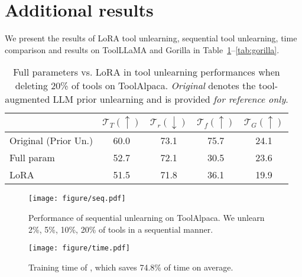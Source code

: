 \section{Additional results}\label{sec:additional_result}
We present the results of LoRA tool unlearning, sequential tool unlearning, time comparison and results on ToolLLaMA and Gorilla in Table~\ref{tab:peft}--\ref{tab:gorilla}.

\begin{table}[t]
\caption{Full parameters vs. LoRA in tool unlearning performances when deleting 20\% of tools on ToolAlpaca. \textit{Original} denotes the tool-augmented LLM prior unlearning and is provided \textit{for reference only}.}
\label{tab:peft}
\vskip 0.15in
\begin{center}
\begin{small}
\begin{sc}
    \begin{tabular}{l|cccc}
    \toprule
     & $\mathcal{T}_T (\uparrow)$ & $\mathcal{T}_r (\downarrow)$ & $\mathcal{T}_f (\uparrow)$ & $\mathcal{T}_G (\uparrow)$ \\
    \midrule
    \rowcolor{Gray}Original (Prior Un.) 
                        & 60.0 & 73.1 & 75.7 & 24.1 \\
    \midrule
    Full param & 52.7 & 72.1 & 30.5 & 23.6 \\
    \midrule
    LoRA       & 51.5 & 71.8 & 36.1 & 19.9 \\
    \bottomrule
    \end{tabular}
\end{sc}
\end{small}
\end{center}
\vskip -0.1in
\end{table}



\begin{figure*}[t]
\vskip 0.2in
\begin{center}
\centerline{\texttt{[image: figure/seq.pdf]}}
\caption{Performance of sequential unlearning on ToolAlpaca. We unlearn 2\%, 5\%, 10\%, 20\% of tools in a sequential manner.}
\label{fig:seq}
\end{center}
\vskip -0.2in
\end{figure*}


\begin{figure}[ht]
\vskip 0.2in
\begin{center}
\centerline{\texttt{[image: figure/time.pdf]}}
\caption{Training time of \method, which saves 74.8\% of time on average.}
\label{fig:time}
\end{center}
\vskip -0.2in
\end{figure}




